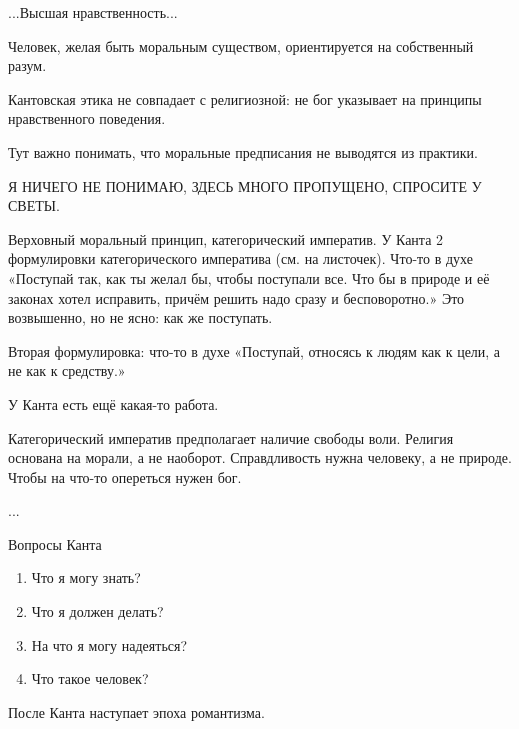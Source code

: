 ...Высшая нравственность...

Человек, желая быть моральным существом, ориентируется на собственный разум.

Кантовская этика не совпадает с религиозной: не бог указывает на принципы нравственного поведения.

Тут важно понимать, что моральные предписания не выводятся из практики.

Я НИЧЕГО НЕ ПОНИМАЮ, ЗДЕСЬ МНОГО ПРОПУЩЕНО, СПРОСИТЕ У СВЕТЫ.

Верховный моральный принцип, категорический императив.
У Канта 2 формулировки категорического императива (см. на листочек). Что-то в духе «Поступай так, как ты желал бы, чтобы поступали все. Что бы в природе и её законах хотел исправить, причём решить надо сразу и бесповоротно.»  Это возвышенно, но не ясно: как же поступать.

Вторая формулировка: что-то в духе «Поступай, относясь к людям как к цели, а не как к средству.»

У Канта есть ещё какая-то работа.

Категорический императив предполагает наличие свободы воли. Религия основана на морали, а не наоборот. 
Справдливость нужна человеку, а не природе. Чтобы на что-то опереться нужен бог.
 

...

Вопросы Канта
\begin{enumerate}
	\item Что я могу знать?
	\item Что я должен делать?
	\item На что я могу надеяться?
	\item Что такое человек?
\end{enumerate}

После Канта наступает эпоха романтизма.